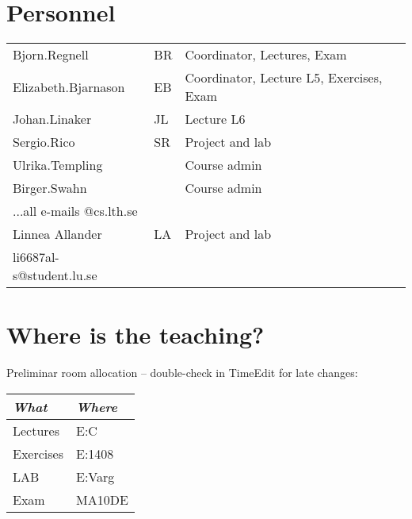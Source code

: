 \section{Personnel}
\begin{flushleft}
	\setlength{\tabcolsep}{0pt}
	\begin{tabular}{p{} p{} p{}}
		Bjorn.Regnell & BR & Coordinator, Lectures, Exam \\
		Elizabeth.Bjarnason & EB & Coordinator, Lecture L5, Exercises, Exam \\
		Johan.Linaker & JL & Lecture L6\\
		Sergio.Rico & SR & Project and lab \\
		Ulrika.Templing & & Course admin \\
		Birger.Swahn & & Course admin \\
		...all e-mails @cs.lth.se\\
		Linnea Allander & LA & Project and lab \\
		li6687al-s@student.lu.se\\
	\end{tabular}
\end{flushleft}

\section{Where is the teaching?}

\noindent Preliminar room allocation -- double-check in TimeEdit for late changes:
\begin{flushleft}
\small
\begin{tabular}{l | l } 
{\it What} & {\it Where} \\
\hline
Lectures & E:C %
\\
Exercises & E:1408 %
\\
LAB& E:Varg %
\\
Exam & MA10DE\\
\end{tabular}
\end{flushleft}

